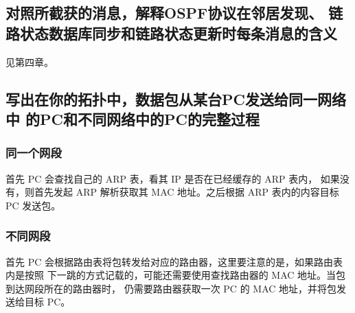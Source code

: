 \documentclass[black,normal,cn]{elegantnote}
\begin{document}
\subsection{对照所截获的消息，解释OSPF协议在邻居发现、
链路状态数据库同步和链路状态更新时每条消息的含义}
见第四章。

\subsection{写出在你的拓扑中，数据包从某台PC发送给同一网络中
的PC和不同网络中的PC的完整过程}
\subsubsection{同一个网段}
首先 PC 会查找自己的 ARP 表，看其 IP 是否在已经缓存的 ARP 表内，
如果没有，则首先发起 ARP 解析获取其 MAC 地址。之后根据 ARP
表内的内容目标 PC 发送包。
\subsubsection{不同网段}
首先 PC 会根据路由表将包转发给对应的路由器，这里要注意的是，如果路由表内是按照
下一跳的方式记载的，可能还需要使用查找路由器的 MAC 地址。当包到达网段所在的路由器时，
仍需要路由器获取一次 PC 的 MAC 地址，并将包发送给目标 PC。 
\end{document}
